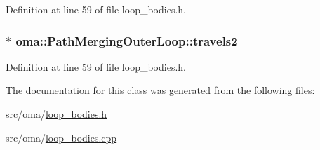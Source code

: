 Definition at line 59 of file loop\-\_\-bodies.\-h.

\hypertarget{classoma_1_1_path_merging_outer_loop_a8d9fc3c7385d6686cec596d6127b9496}{
\subsubsection[{travels2}]{ $\ast$ oma\-::\-Path\-Merging\-Outer\-Loop\-::travels2\hspace{0.3cm}{\ttfamily [protected]}}}\label{classoma_1_1_path_merging_outer_loop_a8d9fc3c7385d6686cec596d6127b9496}


Definition at line 59 of file loop\-\_\-bodies.\-h.



The documentation for this class was generated from the following files\-:\begin{DoxyCompactItemize}
\item 
src/oma/\hyperlink{loop__bodies_8h}{loop\-\_\-bodies.\-h}\item 
src/oma/\hyperlink{loop__bodies_8cpp}{loop\-\_\-bodies.\-cpp}\end{DoxyCompactItemize}
